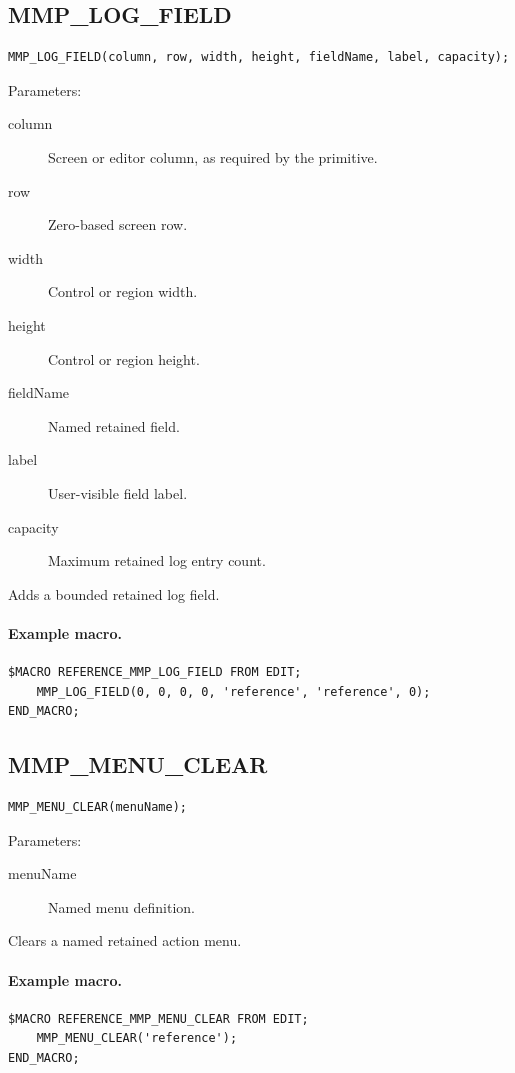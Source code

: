 \documentclass[a4paper,10pt,twoside,openany]{book}
\newenvironment{mrmacextension}{\begin{changebar}}{\end{changebar}}
\begin{document}
\begin{mrmacextension}
\label{prim:procedure-mmp-log-field}
\subsection*{MMP\_LOG\_FIELD}
\begin{verbatim}
MMP_LOG_FIELD(column, row, width, height, fieldName, label, capacity);
\end{verbatim}
Parameters:
\begin{description}
\item[column] Screen or editor column, as required by the primitive.
\item[row] Zero-based screen row.
\item[width] Control or region width.
\item[height] Control or region height.
\item[fieldName] Named retained field.
\item[label] User-visible field label.
\item[capacity] Maximum retained log entry count.
\end{description}

Adds a bounded retained log field.

\paragraph{Example macro.}
\begin{verbatim}
$MACRO REFERENCE_MMP_LOG_FIELD FROM EDIT;
    MMP_LOG_FIELD(0, 0, 0, 0, 'reference', 'reference', 0);
END_MACRO;
\end{verbatim}
\end{mrmacextension}

\begin{mrmacextension}
\label{prim:procedure-mmp-menu-clear}
\subsection*{MMP\_MENU\_CLEAR}
\begin{verbatim}
MMP_MENU_CLEAR(menuName);
\end{verbatim}
Parameters:
\begin{description}
\item[menuName] Named menu definition.
\end{description}

Clears a named retained action menu.

\paragraph{Example macro.}
\begin{verbatim}
$MACRO REFERENCE_MMP_MENU_CLEAR FROM EDIT;
    MMP_MENU_CLEAR('reference');
END_MACRO;
\end{verbatim}
\end{mrmacextension}
\end{document}
